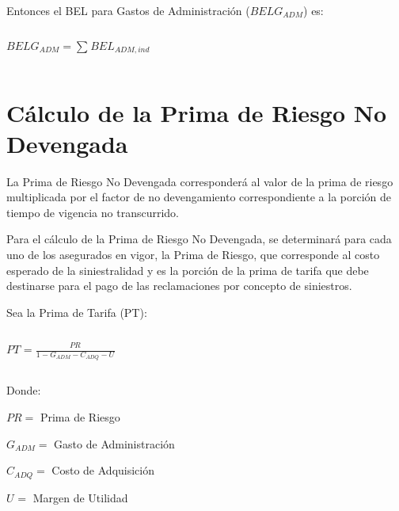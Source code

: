 \documentclass[11pt,twoside,openright,spanish]{report}
\numberwithin{equation}{chapter}
\numberwithin{figure}{chapter}
\numberwithin{table}{chapter}
\begin{document}
$ $

\doublespacing

	Entonces el BEL para Gastos de Administración ($BELG_{ADM}$) es:
	
	\doublespacing

$ $

\doublespacing

	{\centering
	$BELG_{ADM}=\sum _{}^{}BEL_{ADM,ind}^{}$
	\noindent
	
}
	
	\doublespacing

$ $

\doublespacing
	
	\section{Cálculo de la Prima de Riesgo No Devengada}
	\doublespacing
	
	La Prima de Riesgo No Devengada corresponderá al valor de la prima de riesgo multiplicada por el factor de no devengamiento correspondiente a la porción de tiempo de vigencia no transcurrido.
	
	\doublespacing
	
	Para el cálculo de la Prima de Riesgo No Devengada, se determinará para cada uno de los asegurados en vigor, la Prima de Riesgo, que corresponde al costo esperado de la siniestralidad y es la porción de la prima de tarifa que debe destinarse para el pago de las reclamaciones por concepto de siniestros.
	
	\doublespacing
	
	Sea la Prima de Tarifa (PT):
	
	\doublespacing

$ $

\doublespacing
	
		{\centering
		${PT}_{}^{}=\frac{{PR}_{}^{}}{{1}_{}-{}G_{ADM}-{C}_{ADQ}-{U}_{}}$
		\noindent
		
	}	
	
	
	\doublespacing

$ $

\doublespacing
	
	Donde:
	
	\doublespacing
	
	 $PR=$ Prima de Riesgo
	
	$G_{ADM}^{}=$ Gasto de Administración
	
	$C_{ADQ}^{}=$ Costo de Adquisición
	
	$U_{}^{}=$ Margen de Utilidad
	
\end{document}
